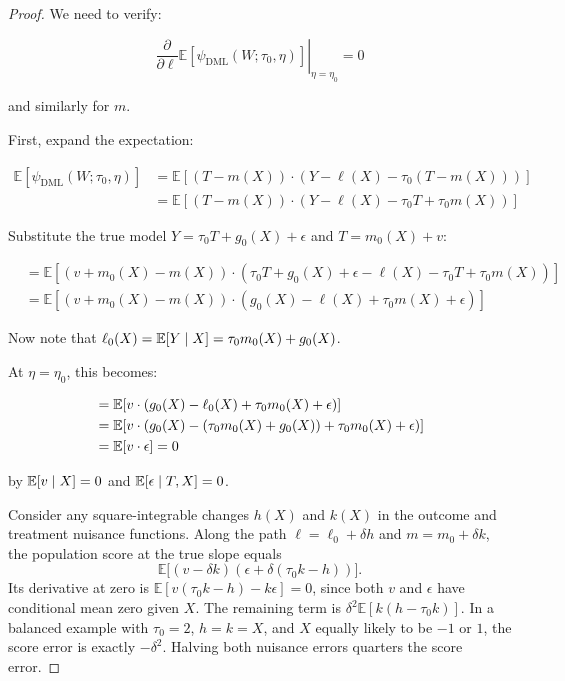 \begin{proof}

We need to verify:

\[\left. \frac{\partial}{\partial \ell} \mathbb{E}[\psi_{\text{DML}}(W; \tau_0, \eta)] \right|_{\eta = \eta_0} = 0\]

and similarly for \(m\).

First, expand the expectation:

\begin{align}
\mathbb{E}[\psi_{\text{DML}}(W; \tau_0, \eta)]
&= \mathbb{E}[(T - m(X)) \cdot (Y - \ell(X) - \tau_0 (T - m(X)))] \\
&= \mathbb{E}[(T - m(X)) \cdot (Y - \ell(X) - \tau_0 T + \tau_0 m(X))]
\end{align}

Substitute the true model \(Y = \tau_0 T + g_0(X) + \epsilon\) and
\(T = m_0(X) + v\):

\begin{align}
&= \mathbb{E}[(v + m_0(X) - m(X)) \cdot (\tau_0 T + g_0(X) + \epsilon - \ell(X) - \tau_0 T + \tau_0 m(X))] \\
&= \mathbb{E}[(v + m_0(X) - m(X)) \cdot (g_0(X) - \ell(X) + \tau_0 m(X) + \epsilon)]
\end{align}

Now note that $\ell_0(X) = \mathbb{E}[Y \mid X] = \tau_0 m_0(X) + g_0(X)$.

At \(\eta = \eta_0\), this becomes:

\begin{align}
&= \mathbb{E}[v \cdot (g_0(X) - \ell_0(X) + \tau_0 m_0(X) + \epsilon)] \\
&= \mathbb{E}[v \cdot (g_0(X) - (\tau_0 m_0(X) + g_0(X)) + \tau_0 m_0(X) + \epsilon)] \\
&= \mathbb{E}[v \cdot \epsilon] = 0
\end{align}

by $\mathbb{E}[v \mid X] = 0$ and $\mathbb{E}[\epsilon \mid T, X] = 0$.

Consider any square-integrable changes $h(X)$ and $k(X)$ in the outcome and treatment nuisance functions. Along the path $\ell=\ell_0+\delta h$ and $m=m_0+\delta k$, the population score at the true slope equals
\[
\mathbb{E}\big[(v-\delta k)(\epsilon+\delta(\tau_0 k-h))\big].
\]
Its derivative at zero is $\mathbb{E}[v(\tau_0 k-h)-k\epsilon]=0$, since both $v$ and $\epsilon$ have conditional mean zero given $X$. The remaining term is $\delta^2\mathbb{E}[k(h-\tau_0 k)]$. In a balanced example with $\tau_0=2$, $h=k=X$, and $X$ equally likely to be $-1$ or $1$, the score error is exactly $-\delta^2$. Halving both nuisance errors quarters the score error.
\end{proof}

